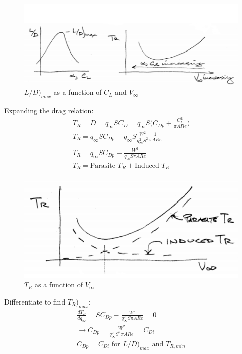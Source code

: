 \documentclass[draft=false, titlepage]{article}
\begin{document}
\begin{figure}[ht]
	\centering
	\includegraphics[width=0.8\linewidth]{Figures/p68_LDMax.PNG}
	\caption{$L/D\big)_{max}$ as a function of $C_L$ and $V_\infty$}
	\label{fig:p68_LDMax}
\end{figure}
Expanding the drag relation:
\begin{gather*}
T_R = D = q_\infty S C_D = q_\infty S \big(C_{Dp} + \frac{C_L^2}{\pi AR e}\big)\\
T_R = q_\infty S C_{Dp} + q_\infty S \frac{W^2}{q_\infty^2 S^2} \frac{1}{\pi AR e}\\
T_R = q_\infty S C_{Dp} + \frac{W^2}{q_\infty S \pi AR e}\\
T_R = \text{Parasite }T_R + \text{Induced }T_R
\end{gather*}
\begin{figure}[ht]
	\centering
	\includegraphics[width=0.5\linewidth]{Figures/p68_thrustRequired.PNG}
	\caption{$T_R$ as a function of $V_\infty$}
	\label{fig:p68_thrustRequired}
\end{figure}

Differentiate to find $T_R\big)_{max}$:
\begin{gather*}
\frac{dT_R}{dq_\infty} = S C_{Dp} - \frac{W^2}{q_\infty^2 S \pi AR e} = 0\\
\rightarrow C_{Dp} = \frac{W^2}{q_\infty^2 S^2 \pi AR e} = C_{Di}\\
\boxed{ C_{Dp}= C_{Di} \text{ for } L/D\big)_{max} \text{ and } T_{R,min} }
\end{gather*}
\end{document}

